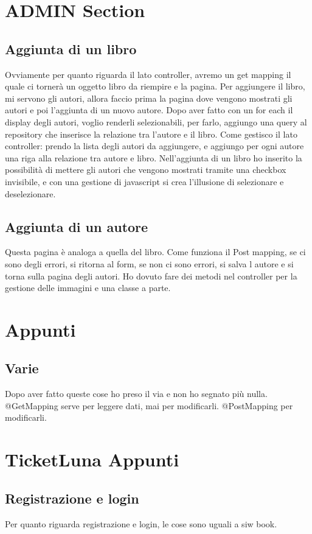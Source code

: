 \documentclass{article}
\numberwithin{equation}{subsection}
\begin{document}
\section{ADMIN Section}
\subsection{Aggiunta di un libro}
Ovviamente per quanto riguarda il lato controller, avremo un get mapping il quale ci tornerà un oggetto libro da riempire e la pagina. Per aggiungere il libro, mi servono gli autori, allora faccio prima la pagina dove vengono mostrati gli autori e poi l'aggiunta di un nuovo autore. Dopo aver fatto con un for each il display degli autori, voglio renderli selezionabili, per farlo, aggiungo una query al repository che inserisce la relazione tra l'autore e il libro. Come gestisco il lato controller: prendo la lista degli autori da aggiungere, e aggiungo per ogni autore una riga alla relazione tra autore e libro. Nell'aggiunta di un libro ho inserito la possibilità di mettere gli autori che vengono mostrati tramite una checkbox invisibile, e con una gestione di javascript si crea l'illusione di selezionare e deselezionare.
\subsection{Aggiunta di un autore}
Questa pagina è analoga a quella del libro. Come funziona il Post mapping, se ci sono degli errori, si ritorna al form, se non ci sono errori, si salva l autore e si torna sulla pagina degli autori. Ho dovuto fare dei metodi nel controller per la gestione delle immagini e una classe a parte.
\section{Appunti}
\subsection{Varie}
Dopo aver fatto queste cose ho preso il via e non ho segnato più nulla. @GetMapping serve per leggere dati, mai per modificarli. @PostMapping per modificarli.
\section{TicketLuna Appunti}
\subsection{Registrazione e login}
Per quanto riguarda registrazione e login, le cose sono uguali a siw book.
\end{document}
